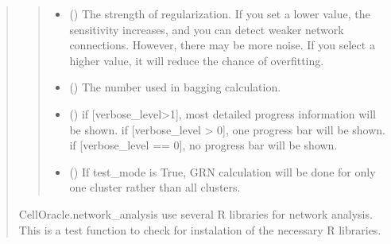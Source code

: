 \documentclass[letterpaper,10pt,english]{sphinxmanual}
\begin{document}
\begin{quote}
\begin{fulllineitems}
\begin{quote}
\begin{description}
\begin{itemize}
\item {} 
 () \textendash{} The strength of regularization.
If you set a lower value, the sensitivity increases, and you can detect weaker network connections. However, there may be more noise.
If you select a higher value, it will reduce the chance of overfitting.

\item {} 
 () \textendash{} The number used in bagging calculation.

\item {} 
 () \textendash{} if {[}verbose\_level\textgreater{}1{]}, most detailed progress information will be shown.
if {[}verbose\_level \textgreater{} 0{]}, one progress bar will be shown.
if {[}verbose\_level == 0{]}, no progress bar will be shown.

\item {} 
 () \textendash{} If test\_mode is True, GRN calculation will be done for only one cluster rather than all clusters.

\end{itemize}

\end{description}\end{quote}

\end{fulllineitems}


\begin{fulllineitems}
\label{\detokenize{modules/celloracle.network_analysis:celloracle.network_analysis.test_R_libraries_installation}}
CellOracle.network\_analysis use several R libraries for network analysis.
This is a test function to check for instalation of the necessary R libraries.


\end{fulllineitems}
\end{quote}
\end{document}
